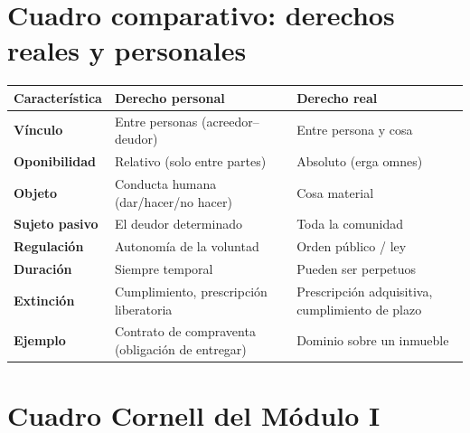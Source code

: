 \documentclass[12pt,oneside]{book}
\begin{document}
\section{Cuadro comparativo: derechos reales y personales}

\begin{table}[H]
\centering
\begin{tabularx}{\textwidth}{
    >{\raggedright\arraybackslash}p{}
    >{\raggedright\arraybackslash}X
    >{\raggedright\arraybackslash}X
}
\toprule
\textbf{Caracter\'istica} & \textbf{Derecho personal} & \textbf{Derecho real} \\
\midrule
\textbf{V\'inculo} & Entre personas (acreedor--deudor) & Entre persona y cosa \\
\textbf{Oponibilidad} & Relativo (solo entre partes) & Absoluto (erga omnes) \\
\textbf{Objeto} & Conducta humana (dar/hacer/no hacer) & Cosa material \\
\textbf{Sujeto pasivo} & El deudor determinado & Toda la comunidad \\
\textbf{Regulaci\'on} & Autonom\'ia de la voluntad & Orden p\'ublico / ley \\
\textbf{Duraci\'on} & Siempre temporal & Pueden ser perpetuos \\
\textbf{Extinci\'on} & Cumplimiento, prescripci\'on liberatoria & Prescripci\'on adquisitiva, cumplimiento de plazo \\
\textbf{Ejemplo} & Contrato de compraventa (obligaci\'on de entregar) & Dominio sobre un inmueble \\
\bottomrule
\end{tabularx}
\end{table}

\section{Cuadro Cornell del M\'odulo I}
\end{document}
